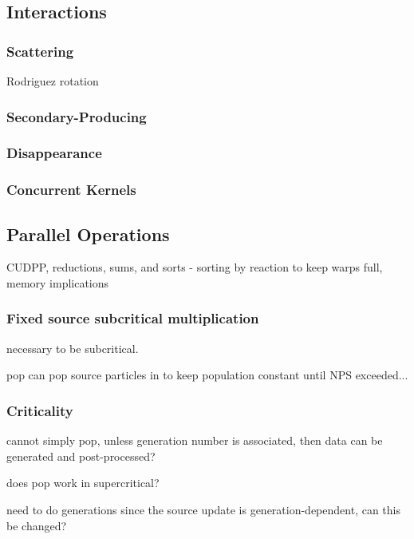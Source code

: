 \subsection{Interactions}

\subsubsection{Scattering}

Rodriguez rotation

\subsubsection{Secondary-Producing}


\subsubsection{Disappearance}


\subsubsection{Concurrent Kernels}

\subsection{Parallel Operations}

CUDPP, reductions, sums, and sorts - sorting by reaction to keep warps full, memory implications

\subsubsection{Fixed source subcritical multiplication}

necessary to be subcritical.

pop can pop source particles in to keep population constant until NPS exceeded...

\subsubsection{Criticality}

cannot simply pop, unless generation number is associated, then data can be generated and post-processed?

does pop work in supercritical?

need to do generations since the source update is generation-dependent, can this be changed?






